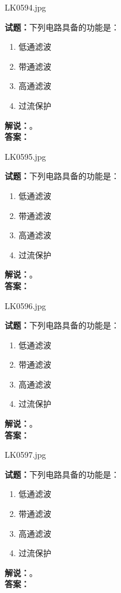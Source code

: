 \documentclass{ctexbook}
\begin{document}
\vspace{\baselineskip}

LK0594.jpg

\noindent\textbf{试题：}下列电路具备的功能是：
\begin{enumerate}[leftmargin=3em]
  \item 低通滤波
  \item 带通滤波
  \item 高通滤波
  \item 过流保护
\end{enumerate}
\noindent\textbf{解说：}\textbf{}。\\\noindent\textbf{答案：}

\vspace{\baselineskip}

LK0595.jpg

\noindent\textbf{试题：}下列电路具备的功能是：
\begin{enumerate}[leftmargin=3em]
  \item 低通滤波
  \item 带通滤波
  \item 高通滤波
  \item 过流保护
\end{enumerate}
\noindent\textbf{解说：}\textbf{}。\\\noindent\textbf{答案：}

\vspace{\baselineskip}

LK0596.jpg

\noindent\textbf{试题：}下列电路具备的功能是：
\begin{enumerate}[leftmargin=3em]
  \item 低通滤波
  \item 带通滤波
  \item 高通滤波
  \item 过流保护
\end{enumerate}
\noindent\textbf{解说：}\textbf{}。\\\noindent\textbf{答案：}

\vspace{\baselineskip}

LK0597.jpg

\noindent\textbf{试题：}下列电路具备的功能是：
\begin{enumerate}[leftmargin=3em]
  \item 低通滤波
  \item 带通滤波
  \item 高通滤波
  \item 过流保护
\end{enumerate}
\noindent\textbf{解说：}\textbf{}。\\\noindent\textbf{答案：}
\end{document}
